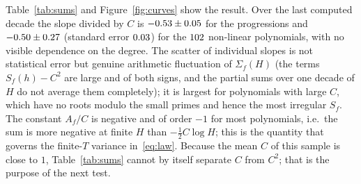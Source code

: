 \documentclass[11pt,a4paper]{article}
\theoremstyle{remark}\newtheorem{remark}[theorem]{Remark}
\begin{document}
Table~\ref{tab:sums} and Figure~\ref{fig:curves} show the result. Over the last computed decade the
slope divided by $C$ is $-0.53\pm0.05$ for the progressions and
$-0.50\pm0.27$ (standard error $0.03$) for the $102$
non-linear polynomials, with no visible dependence on the degree. The scatter of individual slopes is not
statistical error but genuine arithmetic fluctuation of $\Sigma_f(H)$ (the terms $S_f(h)-C^2$ are large
and of both signs, and the partial sums over one decade of $H$ do not average them completely); it is
largest for polynomials with large $C$, which have no roots modulo the small primes and hence the most
irregular $S_f$. The constant $A_f/C$ is negative and of order $-1$ for most polynomials, i.e.\ the
sum is more negative at finite $H$ than $-\tfrac12C\log H$; this is the quantity that governs the
finite-$T$ variance in~\eqref{eq:law}. Because the mean $C$ of this sample is close to $1$,
Table~\ref{tab:sums} cannot by itself separate $C$ from $C^2$; that is the purpose of the next test.
\end{document}
